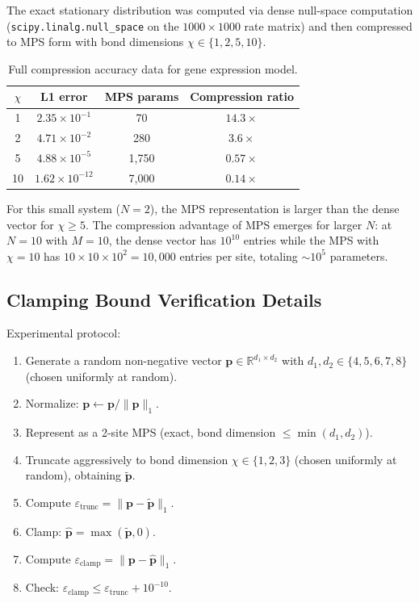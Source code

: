 \documentclass[11pt]{article}
\newcommand{\norm}[1]{\lVert #1 \rVert}
\newcommand{\R}{\mathbb{R}}
\newcommand{\eps}{\varepsilon}
\begin{document}
The exact stationary distribution was computed via dense null-space
computation (\texttt{scipy.linalg.null\_space} on the $1000 \times 1000$
rate matrix) and then compressed to MPS form with bond dimensions
$\chi \in \{1, 2, 5, 10\}$.

\begin{table}[h]
\centering
\caption{Full compression accuracy data for gene expression model.}
\label{tab:compression-full}
\begin{tabular}{cccc}
\toprule
$\chi$ & L1 error & MPS params & Compression ratio \\
\midrule
1  & $2.35 \times 10^{-1}$  & 70      & $14.3\times$ \\
2  & $4.71 \times 10^{-2}$  & 280     & $3.6\times$ \\
5  & $4.88 \times 10^{-5}$  & 1{,}750 & $0.57\times$ \\
10 & $1.62 \times 10^{-12}$ & 7{,}000 & $0.14\times$ \\
\bottomrule
\end{tabular}
\end{table}

For this small system ($N=2$), the MPS representation is larger than
the dense vector for $\chi \geq 5$.
The compression advantage of MPS emerges for larger $N$:
at $N=10$ with $M=10$, the dense vector has $10^{10}$ entries while
the MPS with $\chi=10$ has $10 \times 10 \times 10^2 = 10{,}000$
entries per site, totaling $\sim\!10^5$ parameters.

\subsection{Clamping Bound Verification Details}

Experimental protocol:
\begin{enumerate}[itemsep=1pt]
\item Generate a random non-negative vector $\mathbf{p} \in \R^{d_1 \times d_2}$
  with $d_1, d_2 \in \{4,5,6,7,8\}$ (chosen uniformly at random).
\item Normalize: $\mathbf{p} \leftarrow \mathbf{p} / \norm{\mathbf{p}}_1$.
\item Represent as a 2-site MPS (exact, bond dimension $\leq \min(d_1,d_2)$).
\item Truncate aggressively to bond dimension $\chi \in \{1,2,3\}$
  (chosen uniformly at random), obtaining $\tilde{\mathbf{p}}$.
\item Compute $\eps_{\mathrm{trunc}} = \norm{\mathbf{p} - \tilde{\mathbf{p}}}_1$.
\item Clamp: $\hat{\mathbf{p}} = \max(\tilde{\mathbf{p}}, 0)$.
\item Compute $\eps_{\mathrm{clamp}} = \norm{\mathbf{p} - \hat{\mathbf{p}}}_1$.
\item Check: $\eps_{\mathrm{clamp}} \leq \eps_{\mathrm{trunc}} + 10^{-10}$.
\end{enumerate}
\end{document}
